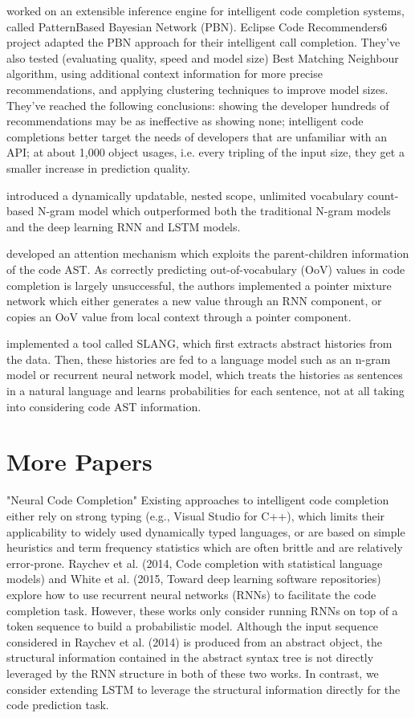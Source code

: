 \cite{Prok15a} worked on an extensible inference engine for intelligent code completion systems, called PatternBased Bayesian Network (PBN). Eclipse Code Recommenders6 project adapted the PBN approach for their intelligent call completion. They've also tested (evaluating quality, speed and model size) Best Matching Neighbour algorithm, using additional context information for more precise recommendations, and applying clustering techniques to improve model sizes. They've reached the following conclusions: showing the developer hundreds of recommendations may be as ineffective as showing none; intelligent code completions better target the needs of developers that are unfamiliar with an API; at about 1,000 object usages, i.e. every tripling of the input size, they get a smaller increase in prediction quality.

\cite{Hell17a} introduced a dynamically updatable, nested scope, unlimited vocabulary count-based N-gram model which outperformed both the traditional N-gram models and the deep learning RNN and LSTM models.

\cite{Li17a} developed an attention mechanism which exploits the parent-children information of the code AST. As correctly predicting out-of-vocabulary (OoV) values in code completion is largely unsuccessful, the authors implemented a pointer mixture network which either generates a new value through an RNN component, or copies an OoV value from local context through a pointer component.

\cite{Rayc14a} implemented a tool called SLANG, which ﬁrst extracts abstract histories from the data. Then, these histories are fed to a language model such as an n-gram model or recurrent neural network model, which treats the histories as sentences in a natural language and learns probabilities for each sentence, not at all taking into considering code AST information.

\section{More Papers}
"Neural Code Completion"
Existing approaches to intelligent code completion either rely on strong typing (e.g., Visual Studio for C++), which limits their applicability to widely used dynamically typed languages, or are based on simple heuristics and term frequency statistics which are often brittle and are relatively error-prone. Raychev et al. (2014, Code completion with statistical language models) and White et al. (2015, Toward deep learning software repositories) explore how to use recurrent neural networks (RNNs) to facilitate the code completion task. However, these works only consider running RNNs on top of a token sequence to build a probabilistic model. Although the input sequence considered in Raychev et al. (2014) is produced from an abstract object, the structural information contained in the abstract syntax tree is not directly leveraged by the RNN structure in both of these two works. In contrast, we consider extending LSTM to leverage the structural information directly for the code prediction task.

